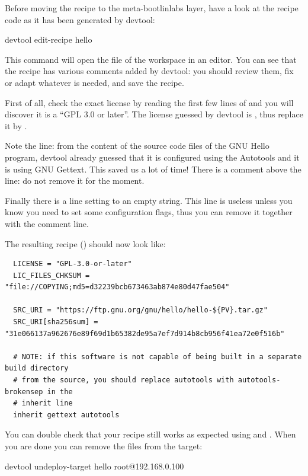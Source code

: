 Before moving the recipe to the meta-bootlinlabs layer, have a look at the
recipe code as it has been generated by devtool:

\begin{bashinput}
devtool edit-recipe hello
\end{bashinput}

This command will open the  file of the workspace in an
editor. You can see that the recipe has various comments added by devtool:
you should review them, fix or adapt whatever is needed, and save the
recipe.

First of all, check the exact license by reading the first few lines of
 and you will discover it is a
``GPL 3.0 or later''. The license guessed by devtool is
, thus replace it by .

Note the  line: from the content of the source code files of
the GNU Hello program, devtool already guessed that it is configured using
the Autotools and it is using GNU Gettext. This saved us a lot of time!
There is a comment above the  line: do not remove it for the
moment.

Finally there is a line setting  to an empty
string. This line is useless unless you know you need to set some
configuration flags, thus you can remove it together with the comment line.

The resulting recipe () should
now look like:
\begin{verbatim}
  LICENSE = "GPL-3.0-or-later"
  LIC_FILES_CHKSUM = "file://COPYING;md5=d32239bcb673463ab874e80d47fae504"

  SRC_URI = "https://ftp.gnu.org/gnu/hello/hello-${PV}.tar.gz"
  SRC_URI[sha256sum] = "31e066137a962676e89f69d1b65382de95a7ef7d914b8cb956f41ea72e0f516b"

  # NOTE: if this software is not capable of being built in a separate build directory
  # from the source, you should replace autotools with autotools-brokensep in the
  # inherit line
  inherit gettext autotools
\end{verbatim}

You can double check that your recipe still works as expected using
 and .
When you are done you can remove the files from the target:
\begin{bashinput}
devtool undeploy-target hello root@192.168.0.100
\end{bashinput}

